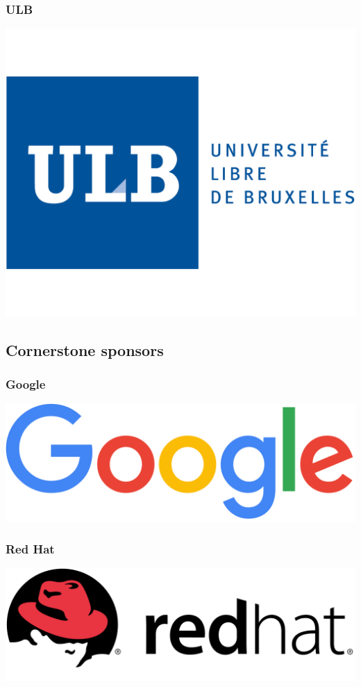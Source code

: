 \documentclass[t]{beamer}
\begin{document}
\begin{frame}
	\frametitle{ULB}
		\includegraphics[scale=1.8]{images/logo_ulb.png}
\end{frame}


\subsection{Cornerstone sponsors}


\begin{frame}
	\frametitle{Google}
	\vfill
		\includegraphics[scale=0.25]{images/google.png}
	\vfill
\end{frame}

\begin{frame}
	\frametitle{Red Hat}
	\vfill
		\includegraphics[scale=0.25]{images/red_hat.png}
	\vfill
\end{frame}
\end{document}
